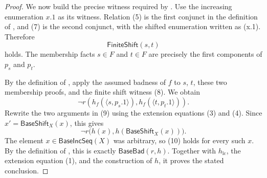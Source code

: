 \begin{proof}
We now build the precise witness required by .  Use
the increasing enumeration $x.1$ as its witness.  Relation (5) is the
first conjunct in the definition of , and (7) is the
second conjunct, with the shifted enumeration written as
(x.1).  Therefore
\[
 \mathsf{FiniteShift}(s,t)                                      \tag{8}
\]
holds.  The membership facts $s\in F$ and $t\in F$ are precisely the
first components of $p_s$ and $p_t$.

By the definition of , apply the assumed
badness of $f$ to $s$, $t$, these two membership proofs, and the finite
shift witness (8).  We obtain
\[
 \neg r\!\left(h_f\!\left(\langle s,p_s.1\rangle\right),
                 h_f\!\left(\langle t,p_t.1\rangle\right)\right). \tag{9}
\]
Rewrite the two arguments in (9) using the extension equations (3) and
(4).  Since $x'=\mathsf{BaseShift}_X(x)$, this gives
\[
 \neg r\bigl(h(x),h(\mathsf{BaseShift}_X(x))\bigr).             \tag{10}
\]
The element $x\in\mathsf{BaseIncSeq}(X)$ was arbitrary, so (10) holds for
every such $x$.  By the definition of , this is exactly
$\mathsf{BaseBad}(r,h)$.  Together with $h_{\mathrm{lc}}$, the extension
equation (1), and the construction of $h$, it proves the stated
conclusion.
\end{proof}
